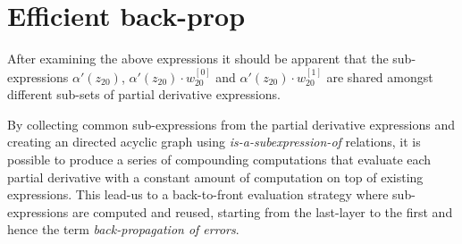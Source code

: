\documentclass{article}
\begin{document}
\section{Efficient back-prop}
After examining the above expressions it should be apparent that the sub-expressions \(\alpha'(z_{20})\), \(\alpha'(z_{20}) \cdot w_{20}^{[0]} \) and \(\alpha'(z_{20}) \cdot w_{20}^{[1]} \) are shared amongst different sub-sets of partial derivative expressions.

By collecting common sub-expressions from the partial derivative expressions and creating an directed acyclic graph using {\em is-a-subexpression-of} relations, it is possible to produce a series of compounding computations that evaluate each partial derivative with a constant amount of computation on top of existing expressions. This lead-us to a back-to-front evaluation strategy where sub-expressions are computed and reused, starting from the last-layer to the first and hence the term {\em back-propagation of errors}.
\end{document}
